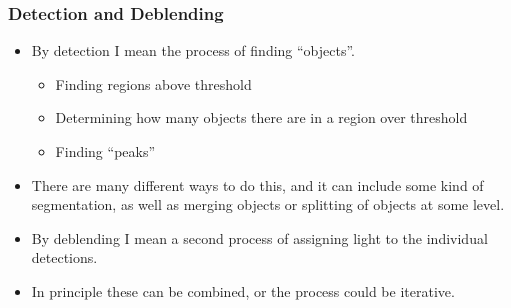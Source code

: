 \documentclass{beamer}
\begin{document}
\frame
{
    \frametitle{Detection and Deblending}

 
    \begin{itemize}

        \item By detection I mean the process of finding ``objects''.
            \begin{itemize}
                \item Finding regions above threshold
                \item Determining how many objects there are in a region over threshold
                \item Finding ``peaks''
            \end{itemize}

        \item There are many different ways to do this, and it can include some
            kind of segmentation, as well as merging objects or splitting of
            objects at some level.

        \item By deblending I mean a second process of assigning light to the
            individual detections.

        \item In principle these can be combined, or the process could be iterative.

    \end{itemize}

}
\end{document}
